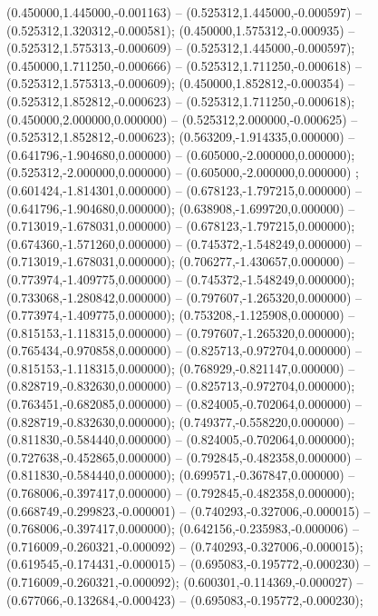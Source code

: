  (0.450000,1.445000,-0.001163) -- (0.525312,1.445000,-0.000597) -- (0.525312,1.320312,-0.000581);
 (0.450000,1.575312,-0.000935) -- (0.525312,1.575313,-0.000609) -- (0.525312,1.445000,-0.000597);
 (0.450000,1.711250,-0.000666) -- (0.525312,1.711250,-0.000618) -- (0.525312,1.575313,-0.000609);
 (0.450000,1.852812,-0.000354) -- (0.525312,1.852812,-0.000623) -- (0.525312,1.711250,-0.000618);
 (0.450000,2.000000,0.000000) -- (0.525312,2.000000,-0.000625) -- (0.525312,1.852812,-0.000623);
 (0.563209,-1.914335,0.000000) -- (0.641796,-1.904680,0.000000) -- (0.605000,-2.000000,0.000000);
 (0.525312,-2.000000,0.000000) -- (0.605000,-2.000000,0.000000) ;
 (0.601424,-1.814301,0.000000) -- (0.678123,-1.797215,0.000000) -- (0.641796,-1.904680,0.000000);
 (0.638908,-1.699720,0.000000) -- (0.713019,-1.678031,0.000000) -- (0.678123,-1.797215,0.000000);
 (0.674360,-1.571260,0.000000) -- (0.745372,-1.548249,0.000000) -- (0.713019,-1.678031,0.000000);
 (0.706277,-1.430657,0.000000) -- (0.773974,-1.409775,0.000000) -- (0.745372,-1.548249,0.000000);
 (0.733068,-1.280842,0.000000) -- (0.797607,-1.265320,0.000000) -- (0.773974,-1.409775,0.000000);
 (0.753208,-1.125908,0.000000) -- (0.815153,-1.118315,0.000000) -- (0.797607,-1.265320,0.000000);
 (0.765434,-0.970858,0.000000) -- (0.825713,-0.972704,0.000000) -- (0.815153,-1.118315,0.000000);
 (0.768929,-0.821147,0.000000) -- (0.828719,-0.832630,0.000000) -- (0.825713,-0.972704,0.000000);
 (0.763451,-0.682085,0.000000) -- (0.824005,-0.702064,0.000000) -- (0.828719,-0.832630,0.000000);
 (0.749377,-0.558220,0.000000) -- (0.811830,-0.584440,0.000000) -- (0.824005,-0.702064,0.000000);
 (0.727638,-0.452865,0.000000) -- (0.792845,-0.482358,0.000000) -- (0.811830,-0.584440,0.000000);
 (0.699571,-0.367847,0.000000) -- (0.768006,-0.397417,0.000000) -- (0.792845,-0.482358,0.000000);
 (0.668749,-0.299823,-0.000001) -- (0.740293,-0.327006,-0.000015) -- (0.768006,-0.397417,0.000000);
 (0.642156,-0.235983,-0.000006) -- (0.716009,-0.260321,-0.000092) -- (0.740293,-0.327006,-0.000015);
 (0.619545,-0.174431,-0.000015) -- (0.695083,-0.195772,-0.000230) -- (0.716009,-0.260321,-0.000092);
 (0.600301,-0.114369,-0.000027) -- (0.677066,-0.132684,-0.000423) -- (0.695083,-0.195772,-0.000230);
